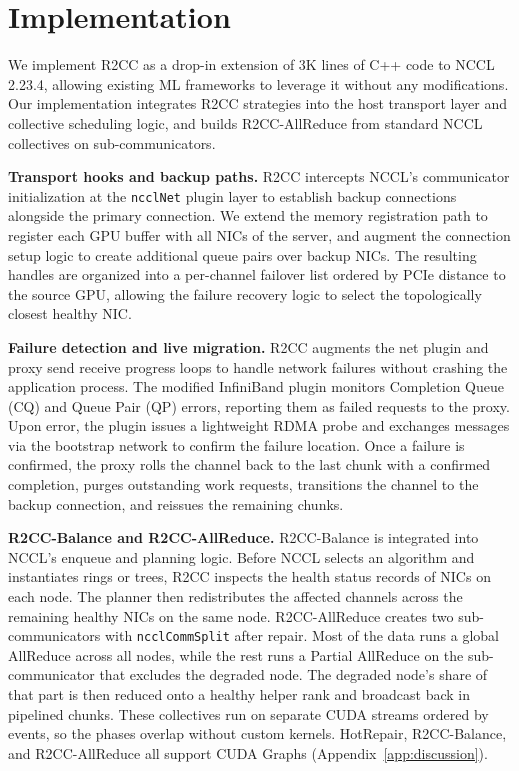 \section{Implementation}
We implement R2CC as a drop-in extension of 3K lines of C++ code to NCCL 2.23.4, allowing existing ML frameworks to leverage it without any modifications. Our implementation integrates R2CC strategies into the host transport layer and collective scheduling logic, and builds R2CC-AllReduce from standard NCCL collectives on sub-communicators.

\smallskip\noindent\textbf{Transport hooks and backup paths.}
R2CC intercepts NCCL's communicator initialization at the \texttt{ncclNet} plugin layer to establish backup connections alongside the primary connection. We extend the memory registration path to register each GPU buffer with all NICs of the server, and augment the connection setup logic to create additional queue pairs over backup NICs. The resulting handles are organized into a per-channel failover list ordered by PCIe distance to the source GPU, allowing the failure recovery logic to select the topologically closest healthy NIC.

\smallskip\noindent\textbf{Failure detection and live migration.}
R2CC augments the net plugin and proxy send receive progress loops to handle network failures without crashing the application process. The modified InfiniBand plugin monitors Completion Queue (CQ) and Queue Pair (QP) errors, reporting them as failed requests to the proxy. Upon error, the plugin issues a lightweight RDMA probe and exchanges messages via the bootstrap network to confirm the failure location. Once a failure is confirmed, the proxy rolls the channel back to the last chunk with a confirmed completion, purges outstanding work requests, transitions the channel to the backup connection, and reissues the remaining chunks.

\smallskip\noindent\textbf{R2CC-Balance and R2CC-AllReduce.}
R2CC-Balance is integrated into NCCL's enqueue and planning logic. Before NCCL selects an algorithm and instantiates rings or trees, R2CC inspects the health status records of NICs on each node. The planner then redistributes the affected channels across the remaining healthy NICs on the same node. R2CC-AllReduce creates two sub-communicators with \texttt{ncclCommSplit} after repair. Most of the data runs a global AllReduce across all nodes, while the rest runs a Partial AllReduce on the sub-communicator that excludes the degraded node. The degraded node's share of that part is then reduced onto a healthy helper rank and broadcast back in pipelined chunks. These collectives run on separate CUDA streams ordered by events, so the phases overlap without custom kernels. HotRepair, R2CC-Balance, and R2CC-AllReduce all support CUDA Graphs (Appendix~\ref{app:discussion}).
